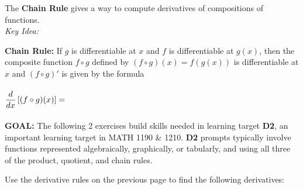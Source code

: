 \documentclass[10pt]{article}
\begin{document}
%    
%




\newpage%



{\bf {}}\mod


The {\bf Chain Rule} gives a way to compute derivatives of compositions of functions. \\
{\em Key Idea:} \\

{\bf Chain Rule:} If $g$ is differentiable at $x$ and $f$ is differentiable at $g(x)$, then the composite function $f \circ g$ defined by $(f \circ g)(x)=f(g(x))$ is differentiable at $x$ and $(f \circ g)'$ is given by the formula \\\\

$\displaystyle \frac{d}{dx}\left[ (f\circ g)(x)\right]=$   
\\\\


{\bf\color{blue} GOAL:} The following 2 exercises build skills needed in learning target {\bf\color{ForestGreen}D2}, an important learning target in MATH 1190 \& 1210. {\bf\color{ForestGreen}D2} prompts typically involve functions represented algebraically, graphically, or tabularly, and using all three of the product, quotient, and chain rules.


{} Use the derivative rules on the previous page to find the following derivatives:
\end{document}
